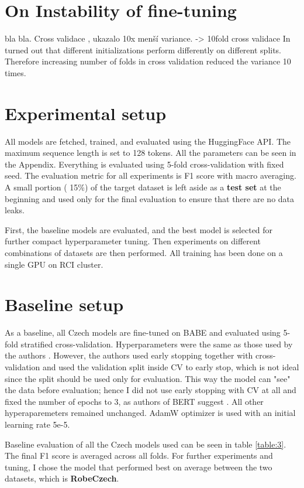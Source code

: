 \section{On Instability of fine-tuning}
bla bla. Cross validace , ukazalo 10x menší variance. -> 10fold cross validace
In turned out that different initializations perform differently on different splits. Therefore increasing number of folds in cross validation reduced the variance 10 times.



\section{Experimental setup}
All models are fetched, trained, and evaluated using the HuggingFace API. The maximum sequence length is set to 128 tokens. All the parameters can be seen in the Appendix.
Everything is evaluated using 5-fold cross-validation with fixed seed. The evaluation metric for all experiments is F1 score with macro averaging. A small portion ( 15\%) of the target dataset is left aside as a \textbf{test set} at the beginning and used only for the final evaluation to ensure that there are no data leaks.

First, the baseline models are evaluated, and the best model is selected for further compact hyperparameter tuning. Then experiments on different combinations of datasets are then performed.
All training has been done on a single GPU on RCI cluster.





 \section{Baseline setup}
 As a baseline, all Czech models are fine-tuned on BABE and evaluated using 5-fold stratified cross-validation. Hyperparameters were the same as those used by the authors \cite{Spinde2021MBIC}. However, the authors used early stopping together with cross-validation and used the validation split inside CV to early stop, which is not ideal since the split should be used only for evaluation. This way the model can "see" the data before evaluation; hence I did not use early stopping with CV at all and fixed the number of epochs to 3, as authors of BERT suggest \cite{devlin2019bert} . 
 All other hyperaparemeters remained unchanged. AdamW optimizer is used with an initial learning rate 5e-5. 
 
 Baseline evaluation of all the Czech models used can be seen in table \ref{table:3}. The final F1 score is averaged across all folds. For further experiments and tuning, I chose the model that performed best on average between the two datasets, which is \textbf{RobeCzech}.
 

